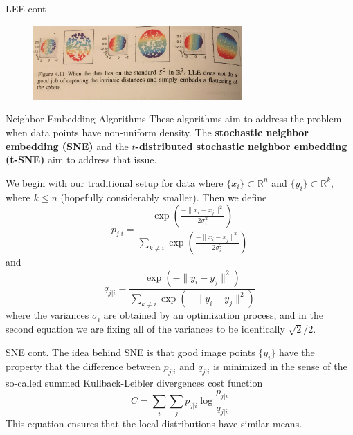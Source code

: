\documentclass{beamer}
\begin{document}
\begin{frame}{LEE cont}
		\begin{figure}[h]
		\centering
		\includegraphics[width=8cm]{../../Figures/fig_manifolde_4_11.jpg}
	\end{figure}			
\end{frame}


\begin{frame}{Neighbor Embedding Algorithms}
	These algorithms aim to address the problem when data points have non-uniform density. The \textbf{stochastic neighbor embedding (SNE)} and the \textbf{$t$-distributed stochastic neighbor embedding (t-SNE)} aim to address that issue.
	
	We begin with our traditional setup for data where $\{x_i\} \subset \mathbb{R}^n$ and $\{y_i\} \subset \mathbb{R}^k$, where $k \le n$ (hopefully considerably smaller). Then we define
	\begin{equation*}
		p_{j|i}= \frac{ \exp( \frac{- \|x_i -x_j\|^2}{2\sigma_i^2})}{ \sum_{k\ne i}\exp( \frac{- \|x_i -x_j\|^2}{2\sigma_i^2})}
	\end{equation*}
	and
	\begin{equation*}
		q_{j|i}= \frac{ \exp( - \|y_i -y_j\|^2)}{ \sum_{k\ne i}\exp( - \|y_i -y_j\|^2)}
	\end{equation*}
		where the variances $\sigma_i$ are obtained by an optimization process, and in the second equation we are fixing all of the variances to be identically $\sqrt{2}/2$. 
\end{frame}
\begin{frame}{SNE cont.}
	The idea behind SNE is that good image points $\{y_i\}$ have the property that the difference between $p_{j|i}$ and $q_{j|i}$ is minimized in the sense of the so-called summed Kullback-Leibler divergences cost function
	\begin{equation*}
		C= \sum_i \sum_j p_{j|i} \log \frac{p_{j|i}}{q_{j|i}}
	\end{equation*} 
	This equation ensures that the local distributions have similar means. 
	
	

\end{frame}
\end{document}
